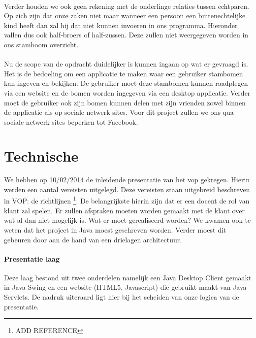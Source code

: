 \documentclass[pdftex,a4paper,12pt,twoside]{report}
\begin{document}
\paragraph{}
Verder houden we ook geen rekening met de onderlinge relaties tussen echtparen. Op zich zijn dat onze zaken niet maar wanneer een persoon een buitenechtelijke kind heeft dan zal hij dat niet kunnen invoeren in ons programma. Hieronder vallen dus ook half-broers of half-zussen. Deze zullen niet weergegeven worden in ons stamboom overzicht.

\paragraph{}
Nu de scope van de opdracht duidelijker is kunnen ingaan op wat er gevraagd is. Het is de bedoeling om een applicatie te maken waar een gebruiker stambomen kan ingeven en bekijken. De gebruiker moet deze stambomen kunnen raadplegen via een website  en de bomen worden ingegeven via een desktop applicatie. Verder moet de gebruiker ook zijn bomen kunnen delen met zijn vrienden zowel binnen de applicatie als op sociale netwerk sites. Voor dit project zullen we ons qua sociale netwerk sites beperken tot Facebook.

\section{Technische}
\paragraph{}
We hebben op 10/02/2014 de inleidende presentatie van het vop gekregen. Hierin werden een aantal vereisten uitgelegd. Deze vereisten staan uitgebreid beschreven in VOP: de richtlijnen \footnote{ADD REFERENCE}. De belangrijkste hierin zijn dat er een docent de rol van klant zal spelen. Er zullen afspraken moeten worden gemaakt met de klant over wat al dan niet mogelijk is. Wat er moet gerealiseerd worden? We kwamen ook te weten dat het project in Java moest geschreven worden. Verder moest dit gebeuren door aan de hand van een drielagen architectuur. 

\paragraph{Presentatie laag}
Deze laag bestond uit twee onderdelen namelijk een Java Desktop Client gemaakt in Java Swing en een website (HTML5, Javascript) die gebruikt maakt van Java Servlets. De nadruk uiteraard ligt hier bij het scheiden van onze logica van de presentatie.
\end{document}
